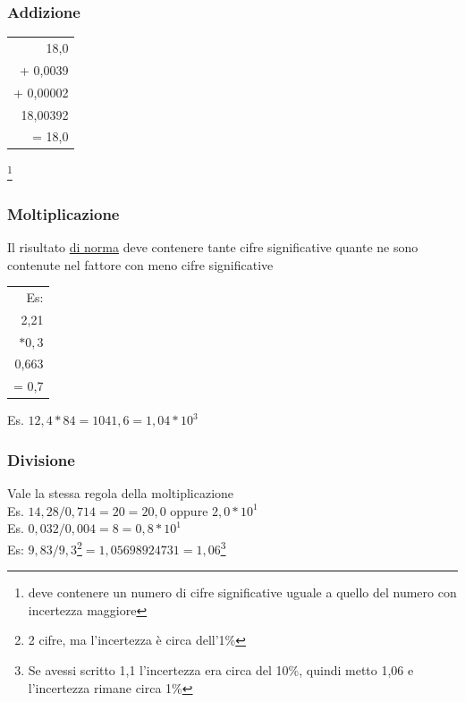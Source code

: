 \documentclass{report}
\begin{document}
\subsubsection{Addizione}
\begin{center}

  \begin{tabular}{r}
    18,0      \\
    + 0,0039  \\
    + 0,00002 \\
    \hline
    18,00392  \\
    = 18,0
  \end{tabular}

\end{center}\footnote{deve contenere un numero di cifre significative uguale a quello del numero con incertezza maggiore}

\subsubsection{Moltiplicazione}
Il risultato \underline{di norma} deve contenere tante cifre significative quante ne sono contenute nel fattore con meno cifre significative
\begin{center}

  \begin{tabular}{r}
    Es:     \\
    2,21    \\
    $* 0,3$ \\
    \hline
    0,663   \\
    = 0,7
  \end{tabular}
\end{center}
Es. $12,4*84=1041,6=1,04*10^{3}$
\subsubsection{Divisione}
Vale la stessa regola della moltiplicazione\\
Es. $14,28/0,714=20=20,0$ oppure $2,0*10^{1}$\\
Es. $0,032/0,004=8=0,8*10^{1}$\\
Es: $9,83/9,3$\footnote{2 cifre, ma l'incertezza è circa dell'1\%}$=1,05698924731=1,06$\footnote{Se avessi scritto 1,1 l'incertezza era circa del 10\%, quindi metto 1,06 e l'incertezza rimane circa 1\%}\\
\end{document}
